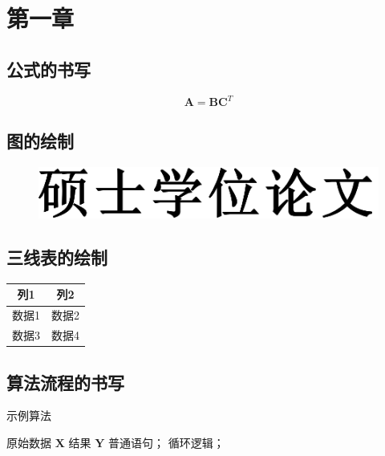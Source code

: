 \chapter{第一章}

\section{公式的书写}

\begin{equation}
\label{eq-1}
    \mathbf{A} = \mathbf{B} \mathbf{C}^T
\end{equation}

\section{图的绘制}

\begin{figure}
    \vspace{1em}
    \centering
    \includegraphics[width=0.7\linewidth]{figures/master-hwzs.pdf}
\end{figure}

\section{三线表的绘制}

\begin{table}[h]
    \centering
    \vspace{0.2cm}
    \wuhao
    \begin{tabular}{cc}
        \hline
        列1 & 列2  \\
        \hline
        数据1 & 数据2 \\
        数据3 & 数据4 \\
        \hline
    \end{tabular}
\end{table}

\section{算法流程的书写}

\begin{algorithm}
    \caption{示例算法}
    \label{alg-1}
    \begin{algorithmic}[1]
        \Require 原始数据 $\mathbf{X}$
        \Ensure 结果 $\mathbf{Y}$
        \State 普通语句；
            \State 循环逻辑；
        \EndFor
    \end{algorithmic}
\end{algorithm}


